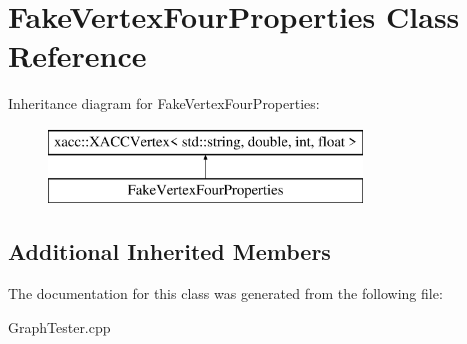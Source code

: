 \hypertarget{a01571}{}\section{Fake\+Vertex\+Four\+Properties Class Reference}
\label{a01571}
Inheritance diagram for Fake\+Vertex\+Four\+Properties\+:\begin{figure}[H]
\begin{center}
\leavevmode
\includegraphics[height=2.000000cm]{a01571}
\end{center}
\end{figure}
\subsection*{Additional Inherited Members}


The documentation for this class was generated from the following file\+:\begin{DoxyCompactItemize}
\item 
Graph\+Tester.\+cpp\end{DoxyCompactItemize}
